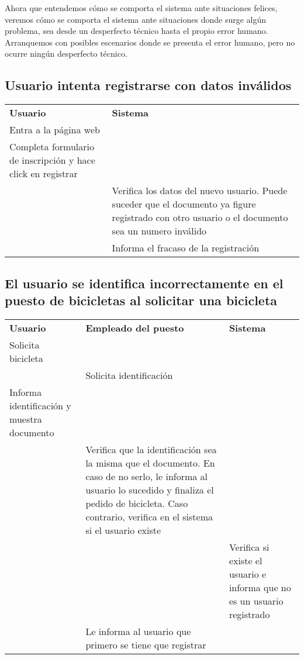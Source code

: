 \documentclass[a4paper, 11pt, spanish]{article}
\begin{document}
\endgroup

\vspace*{0.8cm}

Ahora que entendemos cómo se comporta el sistema ante situaciones felices, veremos cómo se comporta el sistema ante situaciones donde surge algún problema, sea desde un desperfecto técnico hasta el propio error humano. 
Arranquemos con posibles escenarios donde se presenta el error humano, pero no ocurre ningún desperfecto técnico.

\subsection{Usuario intenta registrarse con datos inválidos}

\begingroup
    \fontsize{8pt}{12pt}\selectfont

\begin{tabular}{|p{7cm}|p{7cm}|}
\cline{1-2}
\textbf{Usuario} & \textbf{Sistema} \\ \cline{1-2}
Entra a la página web & \\ \cline{1-2}
Completa formulario de inscripción y hace click en registrar& \\ \cline{1-2}
 &Verifica los datos del nuevo usuario. Puede suceder que el documento ya figure registrado con otro usuario o el documento sea un numero inválido \\ \cline{1-2}
 &Informa el fracaso de la registración\\ \cline{1-2}
\end{tabular}

\endgroup

\subsection{El usuario se identifica incorrectamente en el puesto de bicicletas al solicitar una bicicleta}

\begingroup
    \fontsize{8pt}{12pt}\selectfont

\begin{tabular}{|p{5cm}|p{5cm}|p{5cm}|}
\cline{1-3}
\textbf{Usuario} & \textbf{Empleado del puesto} & \textbf{Sistema} \\ \cline{1-3}
Solicita bicicleta & &\\ \cline{1-3}
 & Solicita identificación &    \\ \cline{1-3}
Informa identificación y muestra documento & & \\ \cline{1-3}
 & Verifica que la identificación sea la misma que el documento. En caso de no serlo, le informa al usuario lo sucedido y finaliza el pedido de bicicleta. Caso contrario, verifica en el sistema si el usuario existe & \\ \cline{1-3}
 & & Verifica si existe el usuario e informa que no es un usuario registrado \\ \cline{1-3}
 & Le informa al usuario que primero se tiene que registrar &  \\ \cline{1-3}
\end{tabular}
\end{document}
